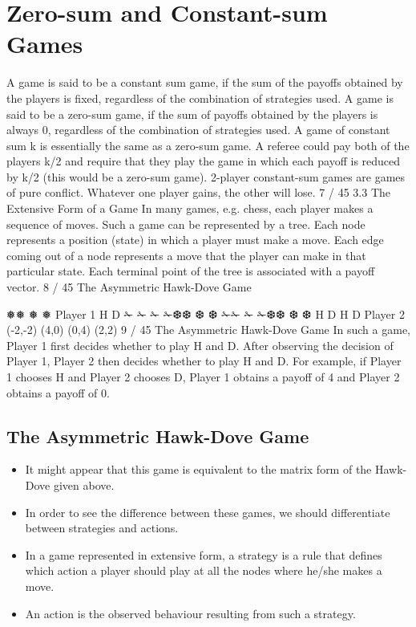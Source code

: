 \documentclass[]{report}
\begin{document}
\section{Zero-sum and Constant-sum Games}
A game is said to be a constant sum game, if the sum of the
payoffs obtained by the players is fixed, regardless of the
combination of strategies used.
A game is said to be a zero-sum game, if the sum of payoffs
obtained by the players is always 0, regardless of the combination
of strategies used.
A game of constant sum k is essentially the same as a zero-sum
game. A referee could pay both of the players k/2 and require that
they play the game in which each payoff is reduced by k/2 (this
would be a zero-sum game).
2-player constant-sum games are games of pure conflict.
Whatever one player gains, the other will lose.
7 / 45
3.3 The Extensive Form of a Game
In many games, e.g. chess, each player makes a sequence of moves.
Such a game can be represented by a tree. Each node represents a
position (state) in which a player must make a move.
Each edge coming out of a node represents a move that the player
can make in that particular state.
Each terminal point of the tree is associated with a payoff vector.
8 / 45
The Asymmetric Hawk-Dove Game



❅❅
❅
❅
Player 1
H D
✁
✁
✁
✁❆❆
❆
❆ ✁✁
✁
✁❆❆
❆
❆
H D H D
Player 2
(-2,-2) (4,0) (0,4) (2,2)
9 / 45
The Asymmetric Hawk-Dove Game
In such a game, Player 1 first decides whether to play H and D.
After observing the decision of Player 1, Player 2 then decides
whether to play H and D.
For example, if Player 1 chooses H and Player 2 chooses D, Player
1 obtains a payoff of 4 and Player 2 obtains a payoff of 0.

\subsection{The Asymmetric Hawk-Dove Game}

\begin{itemize}
\item It might appear that this game is equivalent to the matrix form of
	the Hawk-Dove given above.
\item In order to see the difference between these games, we should
	differentiate between strategies and actions.
\item In a game represented in extensive form, a strategy is a rule that
	defines which action a player should play at all the nodes where
	he/she makes a move.
\item An action is the observed behaviour resulting from such a strategy.
\end{itemize}
\end{document}
